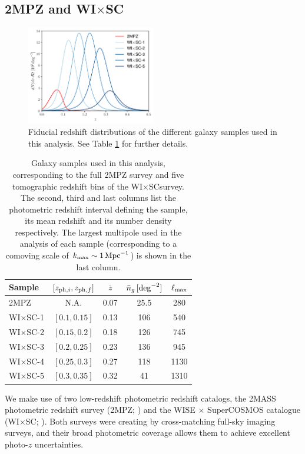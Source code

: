 \documentclass[useAMS,usenatbib]{mn2e}
\newcommand{\wisc}{WI$\times$SC}
\begin{document}
  \subsection{2MPZ and \wisc}\label{ssec:data.g1}
    \begin{figure}
      \centering
      \includegraphics[width=0.5\textwidth]{./figures/nzs.pdf}
      \caption{Fiducial redshift distributions of the different galaxy samples used in this analysis. See Table \ref{tab:z_bins} for further details.}
      \label{fig:dndz}
    \end{figure}
    \begin{table}
      \begin{center}
        \begin{tabular}{l|cccc}
          \hline
          Sample & $[z_{{\rm ph},i},z_{{\rm ph},f}]$ & $\bar{z}$ & $\bar{n}_g\,[{\rm deg}^{-2}]$ & $\ell_{\rm max}$\\
          \hline
          2MPZ    & N.A.         & 0.07 &  25.5 &  280 \\
          \wisc-1 & $[0.1,0.15]$ & 0.13 & 106   &  540 \\
          \wisc-2 & $[0.15,0.2]$ & 0.18 & 126   &  745 \\
          \wisc-3 & $[0.2,0.25]$ & 0.23 & 136   &  945 \\
          \wisc-4 & $[0.25,0.3]$ & 0.27 & 118   & 1130 \\
          \wisc-5 & $[0.3,0.35]$ & 0.32 & 41    & 1310 \\
          \hline
        \end{tabular}
        \caption{Galaxy samples used in this analysis, corresponding to the full 2MPZ survey and five tomographic redshift bins of the \wisc survey. The second, third and last columns list the photometric redshift interval defining the sample, its mean redshift and its number density respectively. The largest multipole used in the analysis of each sample (corresponding to a comoving scale of $k_{\rm max}\sim 1\,{\rm Mpc}^{-1}$) is shown in the last column.}\label{tab:z_bins}
      \end{center}
    \end{table} 
    We make use of two low-redshift photometric redshift catalogs, the 2MASS photometric redshift survey (2MPZ; \cite{2014ApJS..210....9B}) and the WISE $\times$ SuperCOSMOS catalogue (\wisc; \cite{2016ApJS..225....5B}). Both surveys were creating by cross-matching full-sky imaging surveys, and their broad photometric coverage allows them to achieve excellent photo-$z$ uncertainties.
    
\end{document}
